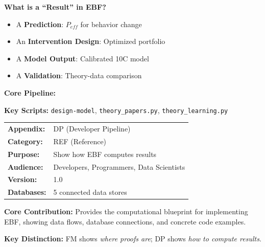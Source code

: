 \begin{tcolorbox}[colback=yellow!10!white, colframe=orange!75!black,
    title=\textbf{Quick Reference: Developer Pipeline}]

\textbf{What is a ``Result'' in EBF?}
\begin{itemize}[nosep]
    \item A \textbf{Prediction}: $P_{eff}$ for behavior change
    \item An \textbf{Intervention Design}: Optimized portfolio
    \item A \textbf{Model Output}: Calibrated 10C model
    \item A \textbf{Validation}: Theory-data comparison
\end{itemize}

\textbf{Core Pipeline:}
\begin{center}
\end{center}

\textbf{Key Scripts:}
\texttt{design-model}, \texttt{theory\_papers.py}, \texttt{theory\_learning.py}

\end{tcolorbox}

\begin{tcolorbox}[colback=blue!5!white, colframe=blue!75!black,
    title=\textbf{Appendix DP: REF-DEVPIPE}]

\begin{tabular}{@{}ll@{}}
\textbf{Appendix:} & DP (Developer Pipeline) \\
\textbf{Category:} & REF (Reference) \\
\textbf{Purpose:} & Show how EBF computes results \\
\textbf{Audience:} & Developers, Programmers, Data Scientists \\
\textbf{Version:} & 1.0 \\
\textbf{Databases:} & 5 connected data stores \\
\end{tabular}

\tcblower

\textbf{Core Contribution:} Provides the computational blueprint for
implementing EBF, showing data flows, database connections, and concrete
code examples.

\textbf{Key Distinction:} FM shows \textit{where proofs are};
DP shows \textit{how to compute results}.

\end{tcolorbox}

